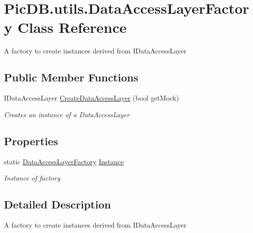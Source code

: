 \hypertarget{class_pic_d_b_1_1utils_1_1_data_access_layer_factory}{}\section{Pic\+D\+B.\+utils.\+Data\+Access\+Layer\+Factory Class Reference}
\label{class_pic_d_b_1_1utils_1_1_data_access_layer_factory}


A factory to create instances derived from I\+Data\+Access\+Layer  


\subsection*{Public Member Functions}
\begin{DoxyCompactItemize}
\item 
I\+Data\+Access\+Layer \mbox{\hyperlink{class_pic_d_b_1_1utils_1_1_data_access_layer_factory_af77c8ea83e31805254322562ac7909d0}{Create\+Data\+Access\+Layer}} (bool get\+Mock)
\begin{DoxyCompactList}\small\item\em Creates an instance of a Data\+Access\+Layer \end{DoxyCompactList}\end{DoxyCompactItemize}
\subsection*{Properties}
\begin{DoxyCompactItemize}
\item 
static \mbox{\hyperlink{class_pic_d_b_1_1utils_1_1_data_access_layer_factory}{Data\+Access\+Layer\+Factory}} \mbox{\hyperlink{class_pic_d_b_1_1utils_1_1_data_access_layer_factory_afc4b41420ecc9b3f36a02937e358592c}{Instance}}
\begin{DoxyCompactList}\small\item\em Instance of factory \end{DoxyCompactList}\end{DoxyCompactItemize}


\subsection{Detailed Description}
A factory to create instances derived from I\+Data\+Access\+Layer 



